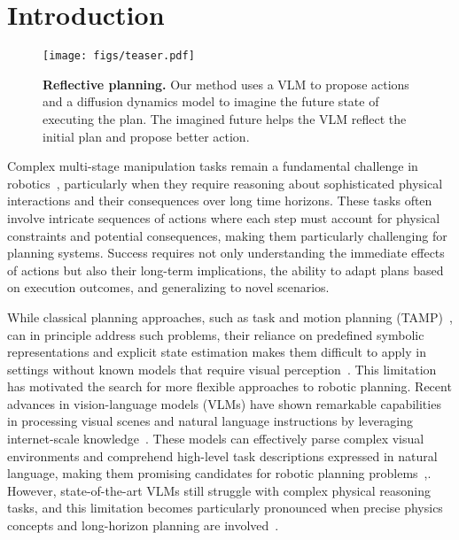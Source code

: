 \section{Introduction}\label{sec:intro}


\begin{figure}[t!]
    \centering
    \texttt{[image: figs/teaser.pdf]}
    \caption{\textbf{Reflective planning.} Our method uses a VLM to propose actions and a diffusion dynamics model to imagine the future state of executing the plan. The imagined future helps the VLM reflect the initial plan and propose better action.}
    \label{fig:teaser}
\end{figure}

Complex multi-stage manipulation tasks remain a fundamental challenge in robotics~\citep{luo2024cable, kroemer2020reviewgmanipulation, Cui2021TowardNL}, particularly when they require reasoning about sophisticated physical interactions and their consequences over long time horizons. These tasks often involve intricate sequences of actions where each step must account for physical constraints and potential consequences, making them particularly challenging for planning systems. Success requires not only understanding the immediate effects of actions but also their long-term implications, the ability to adapt plans based on execution outcomes, and generalizing to novel scenarios.

While classical planning approaches, such as task and motion planning (TAMP)~\citep{kaelbling2011tamp, garrett2020integratedtamp}, can in principle address such problems, their reliance on predefined symbolic representations and explicit state estimation makes them difficult to apply in settings without known models that require visual perception~\citep{driess2020deepvisualreasoninglearning, wang2021learningcompositional}. This limitation has motivated the search for more flexible approaches to robotic planning. Recent advances in vision-language models (VLMs) have shown remarkable capabilities in processing visual scenes and natural language instructions by leveraging internet-scale knowledge~\citep{pali2023, qwen2023, openai2024gpt4ocard, google2024gemini, llava}. These models can effectively parse complex visual environments and comprehend high-level task descriptions expressed in natural language, making them promising candidates for robotic planning problems~\citep{palm-e2023, rt1, rt2,shi2024yal, liu2024moka},. However, state-of-the-art VLMs still struggle with complex physical reasoning tasks, and this limitation becomes particularly pronounced when precise physics concepts and long-horizon planning are involved~\citep{gao2024physicsVLM, chen2024spatialvlm}.

